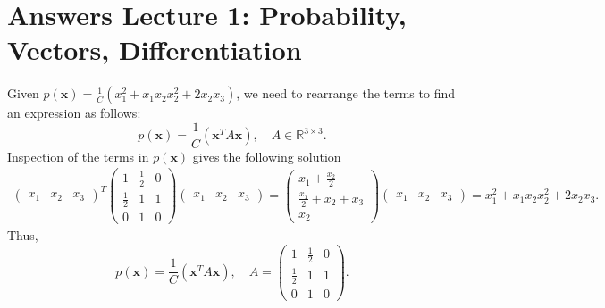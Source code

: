 \section{Answers Lecture 1: Probability, Vectors, Differentiation}

\paragraph{} 

Given $p(\textbf{x}) = \frac{1}{C}(x_1^2 + x_1x_2 x_2^2 + 2x_2x_3)$, we need to rearrange the terms to find an expression as follows:
\begin{equation}
p(\textbf{x}) = \frac{1}{C}(\textbf{x}^T A \textbf{x}), \quad A\in \mathbb{R}^{3\times 3}.
\end{equation}
Inspection of the terms in $p(\textbf{x})$ gives the following solution
\begin{align*}
\begin{pmatrix}
x_1 & x_2 & x_3
\end{pmatrix}^T
\begin{pmatrix}
1 & \frac{1}{2} & 0\\
\frac{1}{2} & 1 & 1\\
0 & 1 & 0
\end{pmatrix}
\begin{pmatrix}
x_1 & x_2 & x_3
\end{pmatrix} =
\begin{pmatrix}
x_1 + \frac{x_2}{2}\\
\frac{x_1}{2} + x_2 + x_3\\
x_2
\end{pmatrix}
\begin{pmatrix}
x_1 & x_2 & x_3
\end{pmatrix} = x_1^2 + x_1x_2 x_2^2 + 2x_2x_3
.\end{align*}
Thus,
\begin{equation}
p(\textbf{x}) = \frac{1}{C}(\textbf{x}^T A \textbf{x}), \quad A = \begin{pmatrix}
1 & \frac{1}{2} & 0\\
\frac{1}{2} & 1 & 1\\
0 & 1 & 0
\end{pmatrix}.
\end{equation}


\paragraph{}

